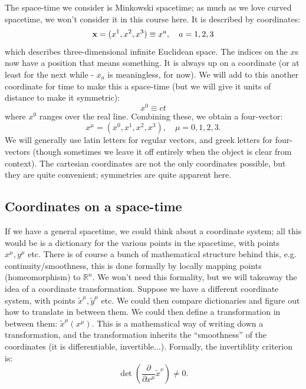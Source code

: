 The space-time we consider is Minkowski spacetime; as much as we love curved spacetime, we won't consider it in this course here. It is described by coordinates:
\begin{equation}
    \mathbf{x} = (x^1, x^2, x^3) \equiv x^a, \quad a = 1,2,3
\end{equation}
which describes three-dimensional infinite Euclidean space. The indices on the $x$s now have a position that means something. It is always up on a coordinate (or at least for the next while - $x_a$ is meaningless, for now). We will add to this another coordinate for time to make this a space-time (but we will give it units of distance to make it symmetric):
\begin{equation}
    x^0 \equiv ct
\end{equation}
where $x^0$ ranges over the real line. Combining these, we obtain a four-vector:
\begin{equation}
    x^\mu = (x^0, x^1, x^2, x^3), \quad \mu=0,1,2,3.
\end{equation}
We will generally use latin letters for regular vectors, and greek letters for four-vectors (though sometimes we leave it off entirely when the object is clear from context). The cartesian coordinates are not the only coordinates possible, but they are quite convenient; symmetries are quite apparent here.

\subsection{Coordinates on a space-time}
If we have a general spacetime, we could think about a coordinate system; all this would be is a dictionary for the various points in the spacetime, with points $x^\mu, y^\mu$ etc. There is of course a bunch of mathematical structure behind this, e.g. continuity/smoothness, this is done formally by locally mapping points (homeomorphism) to $\mathbb{R}^n$. We won't need this formality, but we will takeaway the idea of a coordinate transformation. Suppose we have a different coordinate system, with points $\tilde{x}^\mu, \tilde{y}^\mu$ etc. We could then compare dictionaries and figure out how to translate in between them. We could then define a transformation in between them: $\tilde{x}^\mu(x^\mu)$. This is a mathematical way of writing down a transformation, and the transformation inherits the ``smoothness'' of the coordinates (it is differentiable, invertible...). Formally, the invertiblity criterion is:
\begin{equation}
    \det(\frac{\partial }{\partial x^\mu}\tilde{x}^\nu) \neq 0.
\end{equation}

